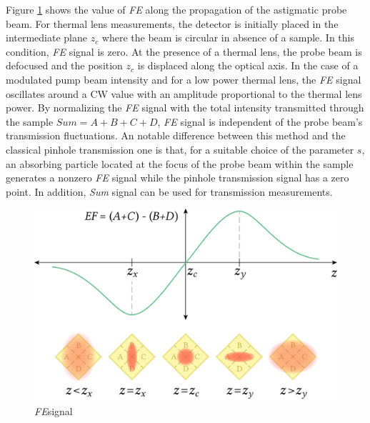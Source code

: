 \documentclass[9pt,twocolumn,twoside]{osajnl}
\newcommand{\FE}{\textit{FE}}
\newcommand{\Sum}{\textit{Sum}}
\begin{document}
Figure \ref{fig:FESignal} shows the value of \FE{} along the propagation of the astigmatic probe beam. For thermal lens measurements, the detector is initially placed in the intermediate plane $z_c$ where the beam is circular in absence of a sample. In this condition, \FE{} signal is zero. At the presence of a thermal lens, the probe beam is defocused and the position $z_c$ is displaced along the optical axis. In the case of a modulated pump beam intensity and for a low power thermal lens, the \FE{} signal oscillates around a CW value with an amplitude proportional to the thermal lens power. By normalizing the \FE{} signal with the total intensity transmitted through the sample $\Sum{} = A+B+C+D$, \FE{} signal is independent of the probe beam's transmission fluctuations. An notable difference between this method and the classical pinhole transmission one is that, for a suitable choice of the parameter $s$, an absorbing particle located at the focus of the probe beam within the sample generates a nonzero \FE{} signal while the pinhole transmission signal has a zero point. In addition, \Sum{} signal can be used for transmission measurements.

\begin{figure}[h]
	\centering \includegraphics[width=.46\textwidth]{figures/FESignal.png}
	\caption{\FE signal}
	\label{fig:FESignal}
\end{figure}

\end{document}
